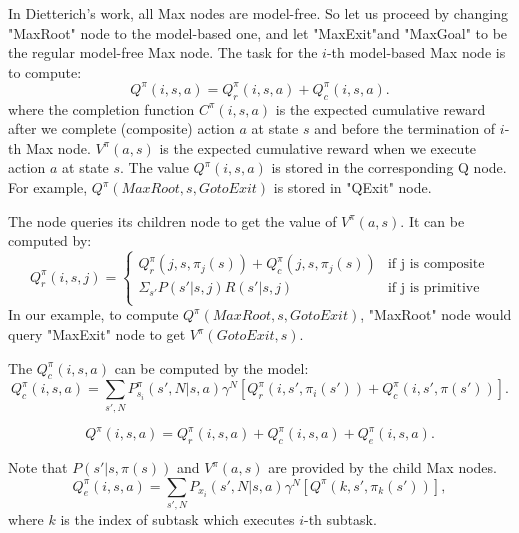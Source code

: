 \documentclass{article} %
\begin{document}
In Dietterich's work, all Max nodes are model-free. 
So let us proceed by changing "MaxRoot" node to the model-based one, and let "MaxExit"and "MaxGoal"
to be the regular model-free Max node.
The task for the $i$-th model-based Max node is to compute:
\begin{equation}
    Q^{\pi}(i, s, a) = Q_r^{\pi}(i, s, a) + Q_c^{\pi}(i, s, a).
    \label{eq:MaxQ}
\end{equation}
where the completion function $C^{\pi}(i, s, a)$ is the expected cumulative reward after
we complete (composite) action $a$ at state $s$ and before the termination of $i$-th Max node.
$V^{\pi}(a, s)$ is the 
expected cumulative reward when we execute action $a$ at state $s$.
The value $Q^{\pi}(i, s, a)$ is stored in the corresponding Q node.
For example, $Q^{\pi}(MaxRoot, s, GotoExit)$ is stored in "QExit" node.

The node queries its children node to get the value of $V^{\pi}(a, s)$.
It can be computed by:
\begin{equation}
    Q_r^{\pi}(i, s, j) = 
    \left\{\begin{array}{ll}
        Q_r^{\pi}(j, s, \pi_j(s)) + Q_c^{\pi}(j, s, \pi_j(s))& \mbox{if j is composite} \\
        \Sigma_{s'} P(s'|s, j)R(s'|s, j) & \mbox{if j is primitive} \\  
    \end{array} \right.
    \label{eq:Qr}
\end{equation}
In our example, to compute $Q^{\pi}(MaxRoot, s, GotoExit)$, "MaxRoot" node would query 
"MaxExit" node to get $V^{\pi}(GotoExit, s)$.

The $Q_c^{\pi}(i, s, a)$ can be computed by the model:
\begin{equation}
    Q_c^{\pi}(i, s, a) = \sum_{s', N} P_{s_i}^{\pi}(s', N|s, a)\gamma^N[Q_r^{\pi}(i, s', \pi_i(s')) + Q_c^{\pi}(i, s', \pi(s'))].
    \label{eq:Qc}
\end{equation}

\begin{equation}
    Q^{\pi}(i, s, a) = Q_r^{\pi}(i, s, a) + Q_c^{\pi}(i, s, a) + Q_e^{\pi}(i, s, a).
    \label{eq:HordQ}
\end{equation}

Note that $P(s'|s, \pi(s))$ and $V^{\pi}(a, s)$ are provided by the child Max nodes.
\begin{equation}
    Q_e^{\pi}(i, s, a) = \sum_{s', N} P_{x_i}(s', N|s, a)\gamma^N[Q^{\pi}(k, s', \pi_k(s'))],
    \label{eq:Qe}
\end{equation}
where $k$ is the index of subtask which executes $i$-th subtask.
\end{document}
